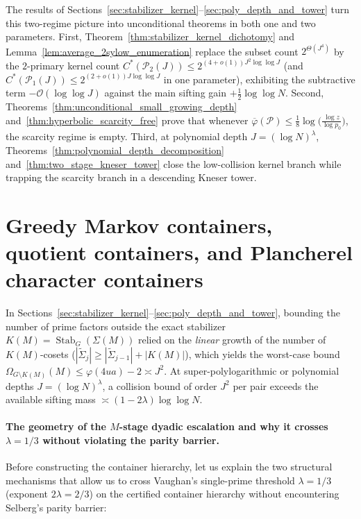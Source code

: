 \documentclass[11pt, a4paper]{article}
\theoremstyle{plain}
\theoremstyle{definition}
\begin{document}
The results of Sections~\ref{sec:stabilizer_kernel}--\ref{sec:poly_depth_and_tower} turn this two-regime picture into unconditional theorems in both one and two parameters. First, Theorem~\ref{thm:stabilizer_kernel_dichotomy} and Lemma~\ref{lem:average_2sylow_enumeration} replace the subset count $2^{\Theta(J^{4})}$ by the $2$-primary kernel count $C^{\ast}(\mathcal{P}_2(J))\le 2^{(4+o(1))J^{2}\log\log J}$ (and $C^{\ast}(\mathcal{P}_1(J))\le 2^{(2+o(1))J\log\log J}$ in one parameter), exhibiting the subtractive term $-\mathcal{O}(\log\log J)$ against the main sifting gain $+\frac12\log\log N$. Second, Theorems~\ref{thm:unconditional_small_growing_depth} and~\ref{thm:hyperbolic_scarcity_free} prove that whenever $\overline{\varphi}(\mathcal{P})\le\frac18\log\big(\frac{\log z}{\log p_0}\big)$, the scarcity regime is empty. Third, at polynomial depth $J=(\log N)^{\lambda}$, Theorems~\ref{thm:polynomial_depth_decomposition} and~\ref{thm:two_stage_kneser_tower} close the low-collision kernel branch while trapping the scarcity branch in a descending Kneser tower.


\section{Greedy Markov containers, quotient containers, and Plancherel character containers}\label{sec:containers}

In Sections~\ref{sec:stabilizer_kernel}--\ref{sec:poly_depth_and_tower}, bounding the number of prime factors outside the exact stabilizer $K(M)=\operatorname{Stab}_G(\Sigma(M))$ relied on the \emph{linear} growth of the number of $K(M)$-cosets ($|\widetilde{\Sigma}_j|\ge|\widetilde{\Sigma}_{j-1}|+|K(M)|$), which yields the worst-case bound $\Omega_{G\setminus K(M)}(M)\le\varphi(4ua)-2\asymp J^{2}$. At super-polylogarithmic or polynomial depths $J=(\log N)^{\lambda}$, a collision bound of order $J^{2}$ per pair exceeds the available sifting mass $\asymp(1-2\lambda)\log\log N$.

\paragraph{The geometry of the $M$-stage dyadic escalation and why it crosses $\lambda=1/3$ without violating the parity barrier.}
Before constructing the container hierarchy, let us explain the two structural mechanisms that allow us to cross Vaughan's single-prime threshold $\lambda=1/3$ (exponent $2\lambda=2/3$) on the certified container hierarchy without encountering Selberg's parity barrier:
\end{document}
